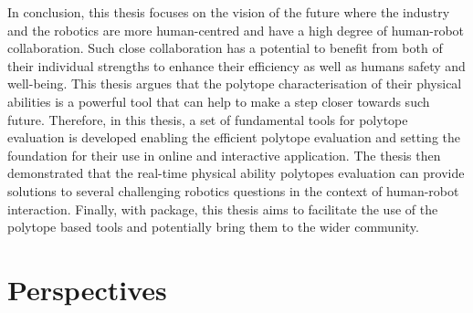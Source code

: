 In conclusion, this thesis focuses on the vision of the future where the industry and the robotics are more human-centred and have a high degree of human-robot collaboration. Such close collaboration has a potential to benefit from both of their individual strengths to enhance their efficiency as well as humans safety and well-being. This thesis argues that the polytope characterisation of their physical abilities is a powerful tool that can help to make a step closer towards such future. Therefore, in this thesis, a set of fundamental tools for polytope evaluation is developed enabling the efficient polytope evaluation and setting the foundation for their use in online and interactive application. The thesis then demonstrated that the real-time physical ability polytopes evaluation can provide solutions to several challenging robotics questions in the context of human-robot interaction. Finally, with  package, this thesis aims to facilitate the use of the polytope based tools and potentially bring them to the wider community.



\section{Perspectives}



